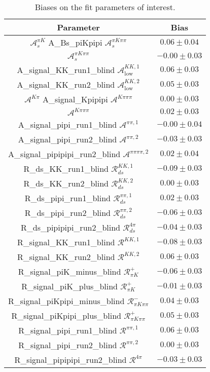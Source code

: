 \begin{table}
  \centering
  \begin{tabular}{cc}
  \toprule
      Parameter & Bias \\
  \midrule
      $\mathcal{A}_s^{\pi K}$
A_Bs_piKpipi $\mathcal{A}_s^{\pi K\pi\pi}$ & $0.06 \pm 0.04$ \\
      $\mathcal{A}_s^{\pi K\pi\pi}$ & $-0.00 \pm 0.03$ \\
      A_signal_KK_run1_blind $\mathcal{A}_\mathrm{low}^{KK,1}$ & $0.06 \pm 0.03$ \\
      A_signal_KK_run2_blind $\mathcal{A}_\mathrm{low}^{KK,2}$ & $0.05 \pm 0.03$ \\
      $\mathcal{A}^{K\pi}$
A_signal_Kpipipi $\mathcal{A}^{K\pi\pi\pi}$ & $0.00 \pm 0.03$ \\
      $\mathcal{A}^{K\pi\pi\pi}$ & $0.02 \pm 0.03$ \\
      A_signal_pipi_run1_blind $\mathcal{A}^{\pi\pi,1}$ & $-0.00 \pm 0.04$ \\
      A_signal_pipi_run2_blind $\mathcal{A}^{\pi\pi,2}$ & $-0.03 \pm 0.03$ \\
      A_signal_pipipipi_run2_blind $\mathcal{A}^{\pi\pi\pi\pi,2}$ & $0.02 \pm 0.04$ \\
      R_ds_KK_run1_blind $\mathcal{R}_{ds}^{KK,1}$ & $-0.09 \pm 0.03$ \\
      R_ds_KK_run2_blind $\mathcal{R}_{ds}^{KK,2}$ & $0.00 \pm 0.03$ \\
      R_ds_pipi_run1_blind $\mathcal{R}_{ds}^{\pi\pi,1}$ & $0.02 \pm 0.03$ \\
      R_ds_pipi_run2_blind $\mathcal{R}_{ds}^{\pi\pi,2}$ & $-0.06 \pm 0.03$ \\
      R_ds_pipipipi_run2_blind $\mathcal{R}_{ds}^{4\pi}$ & $-0.04 \pm 0.03$ \\
      R_signal_KK_run1_blind $\mathcal{R}^{KK,1}$ & $-0.08 \pm 0.03$ \\
      R_signal_KK_run2_blind $\mathcal{R}^{KK,2}$ & $0.06 \pm 0.03$ \\
      R_signal_piK_minus_blind $\mathcal{R}_{\pi K}^+$ & $-0.06 \pm 0.03$ \\
      R_signal_piK_plus_blind $\mathcal{R}_{\pi K}^+$ & $-0.01 \pm 0.03$ \\
      R_signal_piKpipi_minus_blind $\mathcal{R}_{\pi K\pi\pi}^-$ & $0.04 \pm 0.03$ \\
      R_signal_piKpipi_plus_blind $\mathcal{R}_{\pi K\pi\pi}^+$ & $0.05 \pm 0.03$ \\
      R_signal_pipi_run1_blind $\mathcal{R}^{\pi\pi,1}$ & $0.06 \pm 0.03$ \\
      R_signal_pipi_run2_blind $\mathcal{R}^{\pi\pi,2}$ & $0.00 \pm 0.03$ \\
      R_signal_pipipipi_run2_blind $\mathcal{R}^{4\pi}$ & $-0.03 \pm 0.03$ \\
      \bottomrule
  \end{tabular}
  \caption{Biases on the fit parameters of interest.}
\label{tab:biases}
\end{table}
